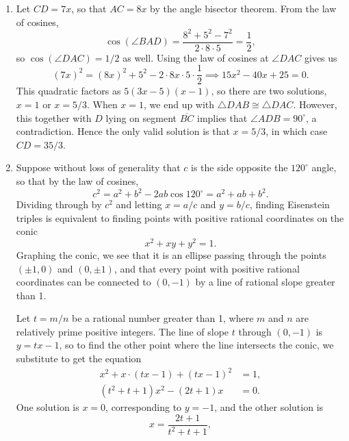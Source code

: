 \begin{enumerate}
\item Let $CD = 7x$, so that $AC = 8x$ by the angle bisector theorem. From the law of cosines,
\begin{equation*}
\cos(\angle BAD) = \frac{8^2 + 5^2 - 7^2}{2\cdot 8\cdot 5} = \frac{1}{2},
\end{equation*}
so $\cos(\angle DAC) = 1/2$ as well. Using the law of cosines at $\angle DAC$ gives us
\begin{equation*}
(7x)^2 = (8x)^2 + 5^2 - 2\cdot 8x\cdot 5\cdot\frac{1}{2}\implies 15x^2 - 40x + 25 = 0.
\end{equation*}
This quadratic factors as $5(3x - 5)(x - 1)$, so there are two solutions, $x = 1$ or $x = 5/3$. When $x = 1$, we end up with $\triangle DAB\cong\triangle DAC$. However, this together with $D$ lying on segment $\overline{BC}$ implies that $\angle ADB = 90^{\circ}$, a contradiction. Hence the only valid solution is that $x = 5/3$, in which case $CD = 35/3$.
\item Suppose without loss of generality that $c$ is the side opposite the $120^{\circ}$ angle, so that by the law of cosines,
\begin{equation*}
c^2 = a^2 + b^2 - 2ab\cos 120^{\circ} = a^2 + ab + b^2.
\end{equation*}
Dividing through by $c^2$ and letting $x = a/c$ and $y = b/c$, finding Eisenstein triples is equivalent to finding points with positive rational coordinates on the conic
\begin{equation*}
x^2 + xy + y^2 = 1.
\end{equation*}
Graphing the conic, we see that it is an ellipse passing through the points $(\pm 1, 0)$ and $(0, \pm 1)$, and that every point with positive rational coordinates can be connected to $(0,-1)$ by a line of rational slope greater than 1.\par
Let $t = m/n$ be a rational number greater than 1, where $m$ and $n$ are relatively prime positive integers. The line of slope $t$ through $(0,-1)$ is $y = tx - 1$, so to find the other point where the line intersects the conic, we substitute to get the equation
\begin{align*}
x^2 + x\cdot (tx - 1) + (tx - 1)^2 &= 1, \\
(t^2 + t + 1)x^2 - (2t + 1)x &= 0.
\end{align*}
One solution is $x = 0$, corresponding to $y = -1$, and the other solution is
\begin{equation*}
x = \frac{2t + 1}{t^2 + t + 1},
\end{equation*}

\end{enumerate}
